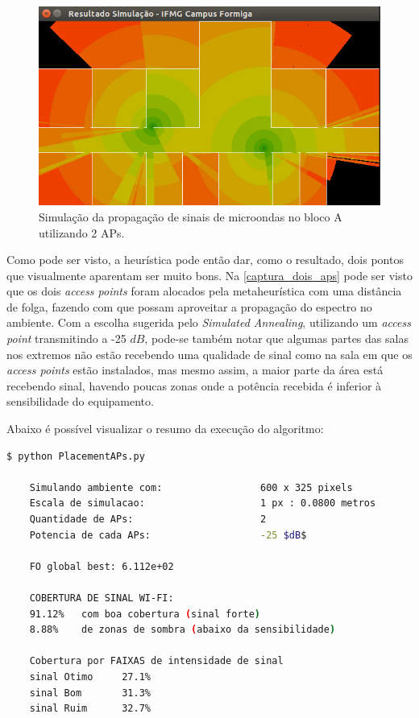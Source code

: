 \documentclass[
	12pt,				%
	twoside,			%
	a4paper,			%
	english,			%
	french,				%
	spanish,			%
	brazil				%
	]{abntex2}
\begin{document}
\begin{figure}[ht]
    \caption{\label{captura_dois_aps} Simulação da propagação de sinais de microondas no bloco A utilizando 2 APs.
    }
    \begin{center}
        \includegraphics[scale=0.6]{imagens/captura-2-aps-2.jpg}
    \end{center}
\end{figure}

Como pode ser visto, a heurística pode então dar, como o resultado, dois
pontos que visualmente aparentam ser muito bons. Na
\autoref{captura_dois_aps} pode ser visto que os dois \emph{access
points} foram alocados pela metaheurística com uma distância de folga,
fazendo com que possam aproveitar a propagação do espectro no ambiente.
Com a escolha sugerida pelo \emph{Simulated Annealing}, utilizando um
\emph{access point} transmitindo a -25 \(dB\), pode-se também notar que
algumas partes das salas nos extremos não estão recebendo uma qualidade
de sinal como na sala em que os \emph{access points} estão instalados,
mas mesmo assim, a maior parte da área está recebendo sinal, havendo
poucas zonas onde a potência recebida é inferior à sensibilidade do
equipamento.

Abaixo é possível visualizar o resumo da execução do algoritmo:

\begin{lstlisting}[language=bash]
    $ python PlacementAPs.py 
    
    Simulando ambiente com:                 600 x 325 pixels
    Escala de simulacao:                    1 px : 0.0800 metros
    Quantidade de APs:                      2
    Potencia de cada APs:                   -25 $dB$
    
    FO global best: 6.112e+02
    
    COBERTURA DE SINAL WI-FI:
    91.12%   com boa cobertura (sinal forte)
    8.88%    de zonas de sombra (abaixo da sensibilidade)
    
    Cobertura por FAIXAS de intensidade de sinal
    sinal Otimo     27.1%
    sinal Bom       31.3%
    sinal Ruim      32.7%
\end{lstlisting}
\end{document}
